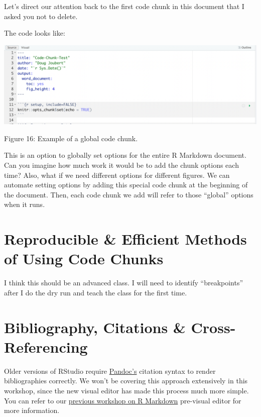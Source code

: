 \documentclass[
]{article}
\begin{document}
Let's direct our attention back to the first code chunk in this document
that I asked you not to delete.

The code looks like:

\includegraphics[width=6.5in,height=\textheight]{images/code-chunk-03.png}

Figure 16: Example of a global code chunk.

This is an option to globally set options for the entire R Markdown
document. Can you imagine how much work it would be to add the chunk
options each time? Also, what if we need different options for different
figures. We can automate setting options by adding this special code
chunk at the beginning of the document. Then, each code chunk we add
will refer to those ``global'' options when it runs.

\hypertarget{reproducible-efficient-methods-of-using-code-chunks}{%
\section{Reproducible \& Efficient Methods of Using Code
Chunks}\label{reproducible-efficient-methods-of-using-code-chunks}}

I think this should be an advanced class. I will need to identify
``breakpoints'' after I do the dry run and teach the class for the first
time.

\hypertarget{bibliography-citations-cross-referencing}{%
\section{Bibliography, Citations \&
Cross-Referencing}\label{bibliography-citations-cross-referencing}}

Older versions of RStudio require
\href{https://pandoc.org/MANUAL.html\#citation-syntax}{Pandoc's}
citation syntax to render bibliographies correctly. We won't be covering
this approach extensively in this workshop, since the new visual editor
has made this process much more simple. You can refer to our
\href{https://ucsbcarpentry.github.io/R-markdown/06-citations-bib/index.html}{previous
workshop on R Markdown} pre-visual editor for more information.
\end{document}
